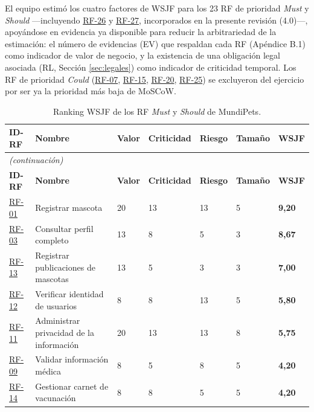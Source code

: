 \documentclass[journal,onecolumn]{IEEEtran}
\begin{document}
	El equipo estimó los cuatro factores de WSJF para los 23 RF de prioridad
	\emph{Must} y \emph{Should} —incluyendo \hyperref[tab:RF-26]{RF-26} y \hyperref[tab:RF-27]{RF-27}, incorporados en la
	presente revisión (4.0)—, apoyándose en evidencia ya disponible para
	reducir la arbitrariedad de la estimación: el número de evidencias (EV) que
	respaldan cada RF (Apéndice B.1) como indicador de valor de negocio, y la
	existencia de una obligación legal asociada (RL, Sección \ref{sec:legales})
	como indicador de criticidad temporal. Los RF de prioridad \emph{Could}
	(\hyperref[tab:RF-07]{RF-07}, \hyperref[tab:RF-15]{RF-15}, \hyperref[tab:RF-20]{RF-20}, \hyperref[tab:RF-25]{RF-25}) se excluyeron del ejercicio por ser ya la
	prioridad más baja de MoSCoW.
	
	\begin{longtable}{@{}p{1.4cm} p{5.4cm} p{1.5cm} p{1.5cm} p{1.5cm} p{1.5cm} p{1.3cm}@{}}
		\caption{Ranking WSJF de los RF \emph{Must} y \emph{Should} de MundiPets.}
		\label{tab:wsjf} \\
		\hline
		\textbf{ID-RF} & \textbf{Nombre} & \textbf{Valor} & \textbf{Criticidad} & \textbf{Riesgo} & \textbf{Tamaño} & \textbf{WSJF} \\
		\hline
		\endfirsthead
		\multicolumn{7}{|l|}{\textit{(continuación)}} \\
		\hline
		\textbf{ID-RF} & \textbf{Nombre} & \textbf{Valor} & \textbf{Criticidad} & \textbf{Riesgo} & \textbf{Tamaño} & \textbf{WSJF} \\
		\hline
		\endhead
		\hline
		\endfoot
		\hyperref[tab:RF-01]{RF-01} & Registrar mascota & 20 & 13 & 13 & 5 & \textbf{9,20} \\
		\hline
		\hyperref[tab:RF-03]{RF-03} & Consultar perfil completo & 13 & 8 & 5 & 3 & \textbf{8,67} \\
		\hline
		\hyperref[tab:RF-13]{RF-13} & Registrar publicaciones de mascotas & 13 & 5 & 3 & 3 & \textbf{7,00} \\
		\hline
		\hyperref[tab:RF-12]{RF-12} & Verificar identidad de usuarios & 8 & 8 & 13 & 5 & \textbf{5,80} \\
		\hline
		\hyperref[tab:RF-11]{RF-11} & Administrar privacidad de la información & 20 & 13 & 13 & 8 & \textbf{5,75} \\
		\hline
		\hyperref[tab:RF-09]{RF-09} & Validar información médica & 8 & 5 & 8 & 5 & \textbf{4,20} \\
		\hline
		\hyperref[tab:RF-14]{RF-14} & Gestionar carnet de vacunación & 8 & 8 & 5 & 5 & \textbf{4,20} \\

\end{longtable}
\end{document}
